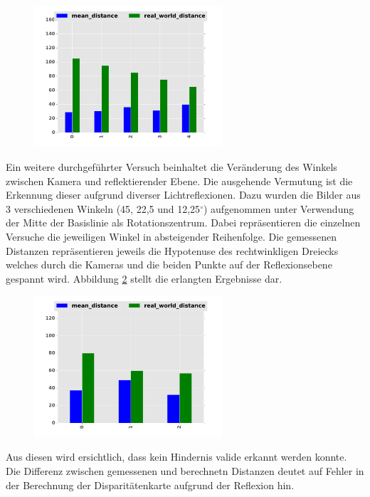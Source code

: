 \begin{figure}[h]
	\centering
	\includegraphics[width=7cm]{img/reflection/reflection_bar}
	\caption{}
	\label{fig:reflection_only}	
\end{figure}

\noindent
Ein weitere durchgeführter Versuch beinhaltet die Veränderung des Winkels zwischen Kamera und reflektierender Ebene. Die ausgehende Vermutung ist die Erkennung dieser aufgrund diverser Lichtreflexionen. Dazu wurden die Bilder aus 3 verschiedenen Winkeln (45, 22,5 und 12,25$^\circ$) aufgenommen unter Verwendung der Mitte der Basislinie als Rotationszentrum. Dabei repräsentieren die einzelnen Versuche die jeweiligen Winkel in absteigender Reihenfolge. Die gemessenen Distanzen repräsentieren jeweils die Hypotenuse des rechtwinkligen Dreiecks welches durch die Kameras und die beiden Punkte auf der Reflexionsebene gespannt wird. Abbildung \ref{fig:rotation_angle} stellt die erlangten Ergebnisse dar.

\begin{figure}
	\centering
	\includegraphics[width=7cm]{img/reflection/angle_bar}
	\caption{}
	\label{fig:rotation_angle}
\end{figure}

\noindent
Aus diesen wird ersichtlich, dass kein Hindernis valide erkannt werden konnte. Die Differenz zwischen gemessenen und berechnetn Distanzen deutet auf Fehler in der Berechnung der Disparitätenkarte aufgrund der Reflexion hin.\\

